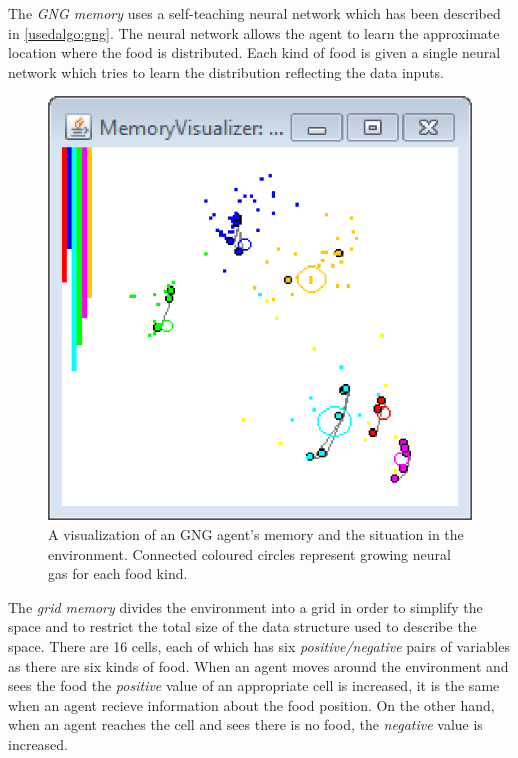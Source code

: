 The \emph{GNG memory} uses a self-teaching neural network which has been described in \ref{usedalgo:gng}. The neural network allows the agent to learn the approximate location where the food is distributed. Each kind of food is given a single neural network which tries to learn the distribution reflecting the data inputs.

\begin{figure}      
\begin{center}
\includegraphics{images/app/gng_screenshot.eps}    
\caption{A visualization of an GNG agent's memory and the situation in the environment. Connected coloured circles represent growing neural gas for each food kind.}
\end{center}                          
\label{app:gngscreenshot}
\end{figure}

The \emph{grid memory} divides the environment into a grid in order to simplify the space and to restrict the total size of the data structure used to describe the space. There are 16 cells, each of which has six \emph{positive/negative} pairs of variables as there are six kinds of food. When an agent moves around the environment and sees the food the \emph{positive} value of an appropriate cell is increased, it is the same when an agent recieve information about the food position. On the other hand, when an agent reaches the cell and sees there is no food, the \emph{negative} value is increased.